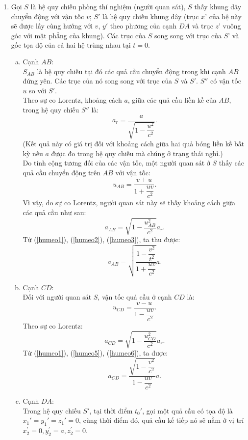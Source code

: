 \begin{loigiai}
\begin{enumerate}[1)]
    \item Gọi $S$ là hệ quy chiếu phòng thí nghiệm (người quan sát), $S$ thấy khung dây chuyển động với vận tốc $v$; $S'$ là hệ quy chiếu khung dây (trục $x’$ của hệ này sẽ được lấy cùng hướng với $v$, $y'$ theo phương của cạnh $DA$ và trục $z’$ vuông góc với mặt phẳng của khung). Các trục của $S$ song song với trục của $S’$ và gốc tọa độ của cả hai hệ trùng nhau tại $t = 0$.
\begin{enumerate}[a)]
    \item Cạnh $AB$:\\
    $S_{AB}$ là hệ quy chiếu tại đó các quả cầu chuyển động trong khi cạnh $AB$ đứng yên. Các trục của nó song song với trục của $S$ và $S'$. $S''$ có vận tốc $u$ so với $S'$.\\
    Theo sự co Lorentz, khoảng cách $a$, giữa các quả cầu liền kề của $AB$, trong hệ quy chiếu $S''$ là:
    \[a_{r}=\dfrac{a}{\sqrt{1-\dfrac{u^{2}}{c^{2}}}}. \tag{1} \label{humeo1}\]
    (Kết quả này có giá trị đối với khoảng cách giữa hai quả bóng liền kề bất kỳ nếu $a$ được đo trong hệ quy chiếu mà chúng ở trạng thái nghỉ.)\\
    Do tính cộng tương đối của các vận tốc, một người quan sát ở $S$ thấy các quả cầu chuyển động trên $AB$ với vận tốc:
    \[u_{A B}=\dfrac{v+u}{1+\dfrac{u v}{c^{2}}}. \tag{2} \label{humeo2}\]
    Vì vậy, do sự co Lorentz, người quan sát này sẽ thấy khoảng cách giữa các quả cầu như sau: 
    \[a_{A B}=\sqrt{1-\dfrac{u_{A B}^{2}}{c^{2}}} a_{r}. \tag{3} \label{humeo3}\]
    Từ (\ref{humeo1}), (\ref{humeo2}), (\ref{humeo3}), ta thu được:
    \[a_{A B}=\sqrt{\dfrac{1-\dfrac{v^{2}}{t^{2}}}{1+\dfrac{u v}{c^{2}}}} a. \tag{4} \label{humeo4}\]
    \item Cạnh $CD:$\\
    Đối với người quan sát $S$, vận tốc quả cầu ở cạnh $CD$ là:
    \[u_{C D}=\dfrac{v-u}{1-\dfrac{u v}{c^{2}}}. \tag{5} \label{humeo5}\]
    Theo sự co Lorentz:
    \[a_{C D}=\sqrt{1-\dfrac{u_{C D}^{2}}{c^{2}}} a_{r}. \tag{6} \label{humeo6}\]
    Từ (\ref{humeo1}), (\ref{humeo5}), (\ref{humeo6}), ta được:
    \[a_{C D}=\dfrac{\sqrt{1-\dfrac{v^{2}}{c^{2}}}}{1-\dfrac{u v}{c^{2}}} a. \tag{7}\]
    \item Cạnh $DA$:\\
    Trong hệ quy chiếu $S'$, tại thời điểm $t_0'$, gọi một quả cầu có tọa độ là $x_1' = y_1' = z_1' = 0$, cùng thời điểm đó, quả cầu kế tiếp nó sẽ nằm ở vị trí $x_{2}^{\prime}=0, y_{2}^{\prime}=a, z_{2}^{\prime}=0$.\\

\end{enumerate}
\end{enumerate}
\end{loigiai}
